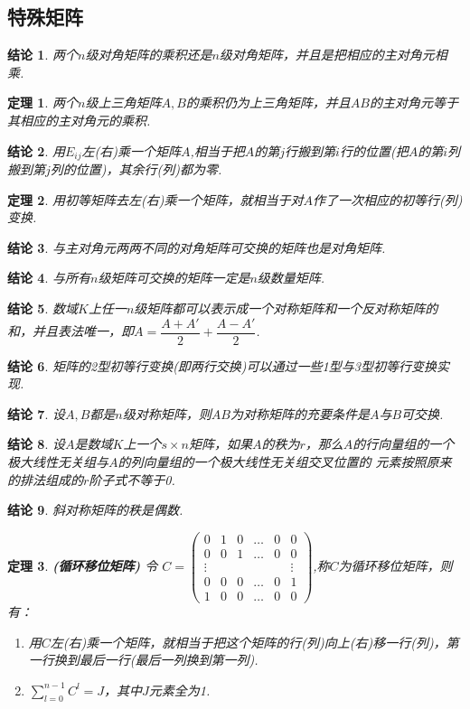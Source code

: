 \documentclass[UTF8]{article}
\newtheorem{thrm}{定理}[subsection]
\newtheorem{ccl}{结论}[subsection]
\begin{document}
\subsection{特殊矩阵}
\begin{ccl}
  两个$n$级对角矩阵的乘积还是$n$级对角矩阵，并且是把相应的主对角元相乘.
\end{ccl}
\begin{thrm}
  两个$n$级上三角矩阵$A,B$的乘积仍为上三角矩阵，并且$AB$的主对角元等于其相应的主对角元的乘积.
\end{thrm}
\begin{ccl}
  用$E_{ij}$左(右)乘一个矩阵$A$,相当于把$A$的第$j$行搬到第$i$行的位置(把$A$的第$i$列搬到第$j$列的位置)，其余行(列)都为零.
\end{ccl}
\begin{thrm}
  用初等矩阵去左(右)乘一个矩阵，就相当于对$A$作了一次相应的初等行(列)变换.
\end{thrm}
\begin{ccl}
  与主对角元两两不同的对角矩阵可交换的矩阵也是对角矩阵.
\end{ccl}
\begin{ccl}
  与所有$n$级矩阵可交换的矩阵一定是$n$级数量矩阵.
\end{ccl}
\begin{ccl}
  数域$K$上任一$n$级矩阵都可以表示成一个对称矩阵和一个反对称矩阵的和，并且表法唯一，即$A=\dfrac{A+A'}{2}+\dfrac{A-A'}{2}$.
\end{ccl}
\begin{ccl}
  矩阵的2型初等行变换(即两行交换)可以通过一些1型与3型初等行变换实现.
\end{ccl}
\begin{ccl}
  设$A,B$都是$n$级对称矩阵，则$AB$为对称矩阵的充要条件是$A$与$B$可交换.
\end{ccl}
\begin{ccl}
  设$A$是数域$K$上一个$s\times n$矩阵，如果$A$的秩为$r$，那么$A$的行向量组的一个极大线性无关组与$A$的列向量组的一个极大线性无关组交叉位置的
  元素按照原来的排法组成的$r$阶子式不等于0.
\end{ccl}
\begin{ccl}
  斜对称矩阵的秩是偶数.
\end{ccl}
\begin{thrm}
  \textbf{(循环移位矩阵) }令 $C=\begin{pmatrix} 0&1&0&\ldots&0&0\\ 0&0&1&\ldots&0&0\\
  \vdots& & & & &\vdots\\ 0&0&0&\ldots&0&1\\ 1&0&0&\ldots&0&0 \end{pmatrix}$,称$C$为循环移位矩阵，则有：
  \begin{enumerate}
    \item 用$C$左(右)乘一个矩阵，就相当于把这个矩阵的行(列)向上(右)移一行(列)，第一行换到最后一行(最后一列换到第一列).
    \item $\sum\limits_{l=0}^{n-1}C^l=J$，其中$J$元素全为1.
  \end{enumerate}
\end{thrm}
\end{document}
